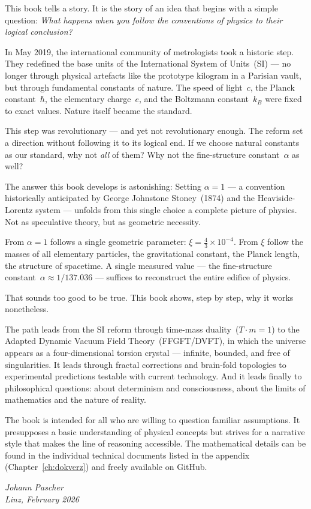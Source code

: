 This book tells a story. It is the story of an idea that begins with a simple question: \emph{What happens when you follow the conventions of physics to their logical conclusion?}

In May 2019, the international community of metrologists took a historic step. They redefined the base units of the International System of Units~(SI) --- no longer through physical artefacts like the prototype kilogram in a Parisian vault, but through fundamental constants of nature. The speed of light~$c$, the Planck constant~$\hbar$, the elementary charge~$e$, and the Boltzmann constant~$k_B$ were fixed to exact values. Nature itself became the standard.

This step was revolutionary --- and yet not revolutionary enough. The reform set a direction without following it to its logical end. If we choose natural constants as our standard, why not \emph{all} of them? Why not the fine-structure constant~$\alpha$ as well?

The answer this book develops is astonishing: Setting $\alpha = 1$ --- a convention historically anticipated by George Johnstone Stoney~(1874) and the Heaviside-Lorentz system --- unfolds from this single choice a complete picture of physics. Not as speculative theory, but as geometric necessity.

From $\alpha = 1$ follows a single geometric parameter: $\xi = \tfrac{4}{3} \times 10^{-4}$. From $\xi$ follow the masses of all elementary particles, the gravitational constant, the Planck length, the structure of spacetime. A single measured value --- the fine-structure constant~$\alpha \approx 1/137.036$ --- suffices to reconstruct the entire edifice of physics.

That sounds too good to be true. This book shows, step by step, why it works nonetheless.

The path leads from the SI reform through time-mass duality~($T \cdot m = 1$) to the Adapted Dynamic Vacuum Field Theory~(FFGFT/DVFT), in which the universe appears as a four-dimensional torsion crystal --- infinite, bounded, and free of singularities. It leads through fractal corrections and brain-fold topologies to experimental predictions testable with current technology. And it leads finally to philosophical questions: about determinism and consciousness, about the limits of mathematics and the nature of reality.

The book is intended for all who are willing to question familiar assumptions. It presupposes a basic understanding of physical concepts but strives for a narrative style that makes the line of reasoning accessible. The mathematical details can be found in the individual technical documents listed in the appendix (Chapter~\ref{ch:dokverz}) and freely available on GitHub.

\begin{flushright}
\textit{Johann Pascher}\\
\textit{Linz, February 2026}
\end{flushright}
